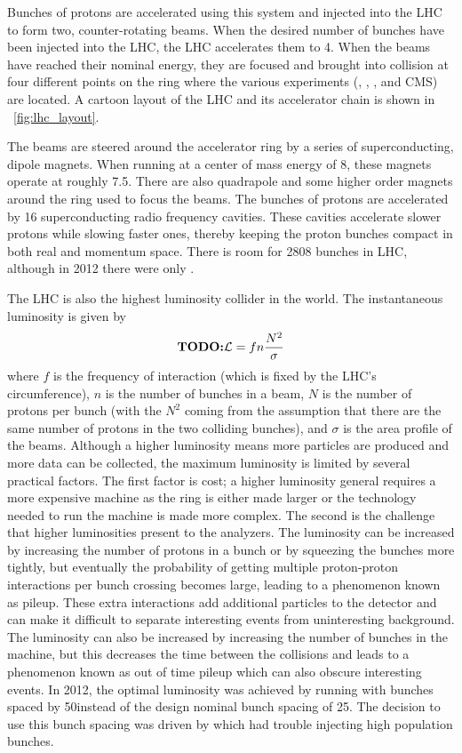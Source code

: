 Bunches of protons are accelerated using this system and injected into the LHC
to form two, counter-rotating beams. When the desired number of bunches have
been injected into the LHC, the LHC accelerates them to 4\TeV. When the beams
have reached their nominal energy, they are focused and brought into collision
at four different points on the ring where the various experiments (\ALICE,
\ATLAS, \LHCB, and CMS) are located. A cartoon layout of the LHC and its
accelerator chain is shown in \FIG~\ref{fig:lhc_layout}.

The beams are steered around the accelerator ring by a series of
superconducting, dipole magnets. When running at a center of mass energy of
8\TeV, these magnets operate at roughly 7.5\Tesla. There are also quadrapole
and some higher order magnets around the ring used to focus the beams. The
bunches of protons are accelerated by 16 superconducting radio frequency
cavities. These cavities accelerate slower protons while slowing faster ones,
thereby keeping the proton bunches compact in both real and momentum space.
There is room for 2808 bunches in LHC, although in 2012 there were only
.

The LHC is also the highest luminosity collider in the world. The instantaneous
luminosity is given by
\begin{equation}
    \TODO{\luminosity=fn\frac{N^{2}}{\sigma}}
\end{equation}
where $f$ is the frequency of interaction (which is fixed by the LHC's
circumference), $n$ is the number of bunches in a beam, $N$ is the number of
protons per bunch (with the $N^{2}$ coming from the assumption that there are
the same number of protons in the two colliding bunches), and $\sigma$ is the
area profile of the beams. Although a higher luminosity means more particles
are produced and more data can be collected, the maximum luminosity is limited
by several practical factors. The first factor is cost; a higher luminosity
general requires a more expensive machine as the ring is either made larger or
the technology needed to run the machine is made more complex. The second is
the challenge that higher luminosities present to the analyzers. The luminosity
can be increased by increasing the number of protons in a bunch or by squeezing
the bunches more tightly, but eventually the probability of getting multiple
proton-proton interactions per bunch crossing becomes large, leading to a
phenomenon known as pileup. These extra interactions add additional particles
to the detector and can make it difficult to separate interesting events from
uninteresting background. The luminosity can also be increased by increasing
the number of bunches in the machine, but this decreases the time between the
collisions and leads to a phenomenon known as out of time pileup which can also
obscure interesting events. In 2012, the optimal luminosity was achieved by
running with bunches spaced by 50\ns instead of the design nominal bunch
spacing of 25\ns. The decision to use this bunch spacing was driven by
\linactwo which had trouble injecting high population bunches.

